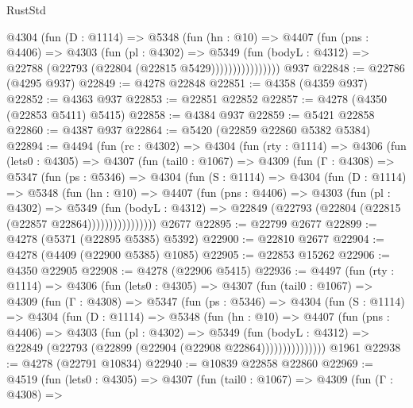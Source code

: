 \begin{lexlean}{RustStd}
\begin{coremodule}
{\begin{coremodule}
{{{{{{{{{{{{{{{{{{{{{{{{{{{{{{{{{{{                  @4304
                    (fun (D : @1114) =>
                    @5348
                      (fun (hn : @10) =>
                      @4407
                        (fun (pns : @4406) =>
                        @4303
                          (fun (pl : @4302) =>
                          @5349
                            (fun (bodyL : @4312) =>
                            @22788 (@22793 (@22804 (@22815 @5429))))))))))))))))
    @937
@22848 := @22786 (@4295 @937)
@22849 := @4278 @22848
@22851 := @4358 (@4359 @937)
@22852 := @4363 @937
@22853 := @22851 @22852
@22857 := @4278 (@4350 (@22853 @5411) @5415)
@22858 := @4384 @937
@22859 := @5421 @22858
@22860 := @4387 @937
@22864 := @5420 (@22859 @22860 @5382 @5384)
@22894 := @4494
    (fun (rc : @4302) =>
    @4304
      (fun (rty : @1114) =>
      @4306
        (fun (lets0 : @4305) =>
        @4307
          (fun (tail0 : @1067) =>
          @4309
            (fun (Γ : @4308) =>
            @5347
              (fun (ps : @5346) =>
              @4304
                (fun (S : @1114) =>
                @4304
                  (fun (D : @1114) =>
                  @5348
                    (fun (hn : @10) =>
                    @4407
                      (fun (pns : @4406) =>
                      @4303
                        (fun (pl : @4302) =>
                        @5349
                          (fun (bodyL : @4312) =>
                          @22849 (@22793 (@22804 (@22815 (@22857 @22864))))))))))))))))
    @2677
@22895 := @22799 @2677
@22899 := @4278 (@5371 (@22895 @5385) @5392)
@22900 := @22810 @2677
@22904 := @4278 (@4409 (@22900 @5385) @1085)
@22905 := @22853 @15262
@22906 := @4350 @22905
@22908 := @4278 (@22906 @5415)
@22936 := @4497
    (fun (rty : @1114) =>
    @4306
      (fun (lets0 : @4305) =>
      @4307
        (fun (tail0 : @1067) =>
        @4309
          (fun (Γ : @4308) =>
          @5347
            (fun (ps : @5346) =>
            @4304
              (fun (S : @1114) =>
              @4304
                (fun (D : @1114) =>
                @5348
                  (fun (hn : @10) =>
                  @4407
                    (fun (pns : @4406) =>
                    @4303
                      (fun (pl : @4302) =>
                      @5349
                        (fun (bodyL : @4312) =>
                        @22849 (@22793 (@22899 (@22904 (@22908 @22864)))))))))))))))
    @1961
@22938 := @4278 (@22791 @10834)
@22940 := @10839 @22858 @22860
@22969 := @4519
    (fun (lets0 : @4305) =>
    @4307
      (fun (tail0 : @1067) =>
      @4309
        (fun (Γ : @4308) =>
}}}}}}}}}}}}}}}}}}}}}}}}}}}}}}}}}}}
\end{coremodule}}
\end{coremodule}
\end{lexlean}
